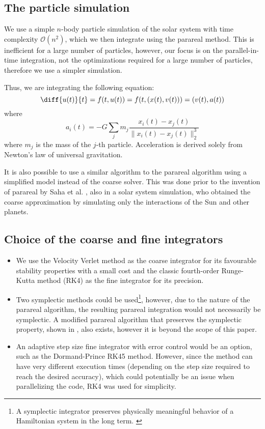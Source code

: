 \documentclass[conference]{IEEEtran}
\begin{document}
\subsection{The particle simulation}
We use a simple $n$-body particle simulation of the solar system with time complexity $\mathcal{O}(n^2)$, which we then integrate using the parareal method. This is inefficient for a large number of particles, however, our focus is on the parallel-in-time integration, not the optimizations required for a large number of particles, therefore we use a simpler simulation.

Thus, we are integrating the following equation:
$$
\diff{u(t)}{t} = f(t, u(t)) = f(t, (x(t), v(t))) = (v(t), a(t))
$$
where 
$$
a_i(t) = -G \sum_j m_j\frac{x_i(t)-x_j(t)}{\|x_i(t)-x_j(t)\|_2^3}
$$
where $m_j$ is the mass of the $j$-th particle. Acceleration is derived solely from Newton's law of universal gravitation.

It is also possible to use a similar algorithm to the parareal algorithm using a simplified model instead of the coarse solver. This was done prior to the invention of parareal by Saha et al. \cite{parallelsolar}, also in a solar system simulation, who obtained the coarse approximation by simulating only the interactions of the Sun and other planets. \cite{parallelsolar} \cite{farfuture}

\subsection{Choice of the coarse and fine integrators}
\begin{itemize}
    \item We use the Velocity Verlet method as the coarse integrator for its favourable stability properties with a small cost and the classic fourth-order Runge-Kutta method (RK4) as the fine integrator for its precision. \cite{integration}
    \item Two symplectic methods could be used\footnote{A symplectic integrator preserves physically meaningful behavior of a Hamiltonian system in the long term. \cite{integration}}, however, due to the nature of the parareal algorithm, the resulting parareal integration would not necessarily be symplectic. A modified parareal algorithm that preserves the symplectic property, shown in \cite{symplecticparareal}, also exists, however it is beyond the scope of this paper.
    \item An adaptive step size fine integrator with error control would be an option, such as the Dormand-Prince RK45 method. However, since the method can have very different execution times (depending on the step size required to reach the desired accuracy), which could potentially be an issue when parallelizing the code, RK4 was used for simplicity.
\end{itemize}
\end{document}
